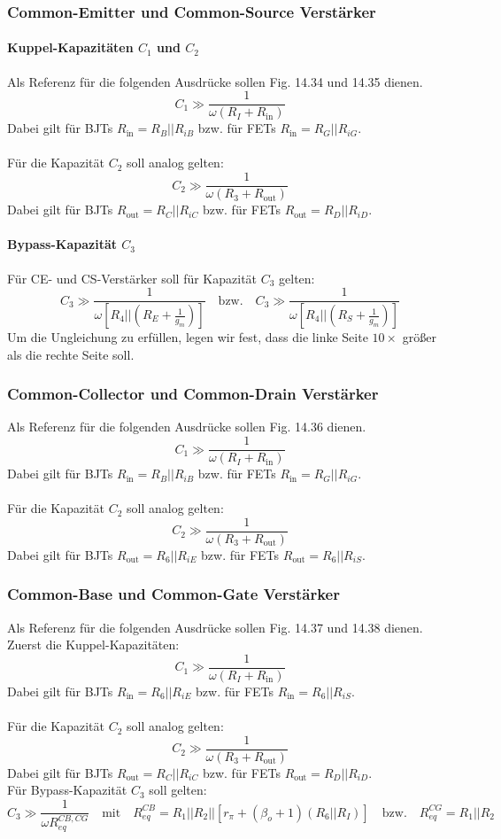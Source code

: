 \documentclass[11pt,a4paper,titlepage]{article}
\begin{document}
\subsubsection{Common-Emitter und Common-Source Verstärker}
\paragraph{Kuppel-Kapazitäten $C_1$ und $C_2$} Als Referenz für die folgenden Ausdrücke sollen Fig. 14.34 und 14.35 dienen.
 \[ C_1 \gg \frac{1}{\omega(R_I+R_{\text{in}})} \]
 Dabei gilt für BJTs $R_{\text{in}}=R_B||R_{iB}$ bzw. für FETs $R_{\text{in}}=R_G||R_{iG}$.\\
 \\
 Für die Kapazität $C_2$ soll analog gelten:
 \[ C_2 \gg \frac{1}{\omega(R_3+R_{\text{out}})} \]
 Dabei gilt für BJTs $R_{\text{out}}=R_C||R_{iC}$ bzw. für FETs $R_{\text{out}}=R_D||R_{iD}$.
 
 \paragraph{Bypass-Kapazität $C_3$}
 Für CE- und CS-Verstärker soll für Kapazität $C_3$ gelten:
 \[ C_3 \gg \frac{1}{\omega \left[ R_4 || \left( R_E+\frac{1}{g_m} \right) \right]} \quad \text{bzw.} \quad C_3 \gg \frac{1}{\omega \left[ R_4 || \left( R_S+\frac{1}{g_m} \right) \right]} \]
 Um die Ungleichung zu erfüllen, legen wir fest, dass die linke Seite $10 \times$ größer als die rechte Seite soll.
 
 \subsubsection{Common-Collector und Common-Drain Verstärker}
 Als Referenz für die folgenden Ausdrücke sollen Fig. 14.36 dienen.
 \[ C_1 \gg \frac{1}{\omega(R_I+R_{\text{in}})} \]
 Dabei gilt für BJTs $R_{\text{in}}=R_B||R_{iB}$ bzw. für FETs $R_{\text{in}}=R_G||R_{iG}$.\\
 \\
 Für die Kapazität $C_2$ soll analog gelten:
 \[ C_2 \gg \frac{1}{\omega(R_3+R_{\text{out}})} \]
 Dabei gilt für BJTs $R_{\text{out}}=R_6||R_{iE}$ bzw. für FETs $R_{\text{out}}=R_6||R_{iS}$.
 
 \subsubsection{Common-Base und Common-Gate Verstärker}
 Als Referenz für die folgenden Ausdrücke sollen Fig. 14.37 und 14.38 dienen. Zuerst die Kuppel-Kapazitäten:
 \[ C_1 \gg \frac{1}{\omega(R_I+R_{\text{in}})} \]
 Dabei gilt für BJTs $R_{\text{in}}=R_6||R_{iE}$ bzw. für FETs $R_{\text{in}}=R_6||R_{iS}$.\\
 \\
 Für die Kapazität $C_2$ soll analog gelten:
 \[ C_2 \gg \frac{1}{\omega(R_3+R_{\text{out}})} \]
 Dabei gilt für BJTs $R_{\text{out}}=R_C||R_{iC}$ bzw. für FETs $R_{\text{out}}=R_D||R_{iD}$.\\
 Für Bypass-Kapazität $C_3$ soll gelten:
 \[ C_3 \gg \frac{1}{\omega R_{eq}^{CB,CG}} \quad \text{mit} \quad R_{eq}^{CB}=R_1||R_2||[r_{\pi}+(\beta_o+1)(R_6||R_I)] \quad \text{bzw.} \quad R_{eq}^{CG}=R_1||R_2 \]
 
\end{document}

